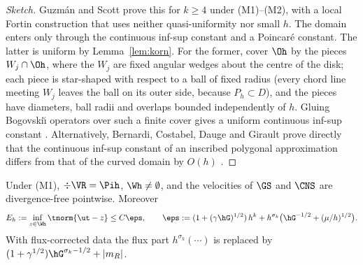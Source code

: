 \begin{proof}[Sketch]
Guzm\'an and Scott \cite[Theorem~1]{GuzmanScott2019} prove this for $k\ge4$ under (M1)--(M2), with a local Fortin construction that uses neither quasi-uniformity nor small $h$. The domain enters only through the continuous inf-sup constant and a Poincar\'e constant. The latter is uniform by Lemma~\ref{lem:korn}. For the former, cover $\Oh$ by the pieces $W_j\cap\Oh$, where the $W_j$ are fixed angular wedges about the centre of the disk; each piece is star-shaped with respect to a ball of fixed radius (every chord line meeting $W_j$ leaves the ball on its outer side, because $P_h\subset D$), and the pieces have diameters, ball radii and overlaps bounded independently of $h$. Gluing Bogovski\u{\i} operators over such a finite cover gives a uniform continuous inf-sup constant \cite{PadhiExt}. Alternatively, Bernardi, Costabel, Dauge and Girault prove directly that the continuous inf-sup constant of an inscribed polygonal approximation differs from that of the curved domain by $O(h)$ \cite[Theorem~4.6]{BCDG2016}. %
\end{proof}

\begin{lemma}\label{lem:approx}
Under (M1), $\div\VR=\Pih$, $\Wh\ne\emptyset$, and the velocities of $\GS$ and $\CNS$ are divergence-free pointwise. Moreover
\[
E_h:=\inf_{z\in\Wh}\tnorm{\ut-z}\le C\eps,\qquad \eps:=(1+(\gamma\hG)^{1/2})\,h^k+h^{\sigma_k}\bigl(\hG^{-1/2}+(\mu/h)^{1/2}\bigr).
\]
With flux-corrected data the flux part $h^{\sigma_k}(\cdots)$ is replaced by $(1+\gamma^{1/2})\hG^{\sigma_k-1/2}+|m_R|$.
\end{lemma}

